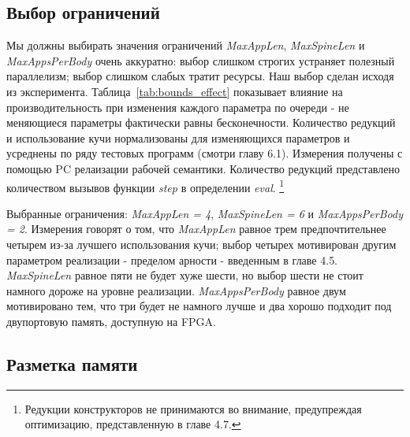\documentclass[flenqn, 14pt]{extarticle}
\begin{document}
\subsection{Выбор ограничений}
Мы должны выбирать значения ограничений \textit{MaxAppLen}, \textit{MaxSpineLen} и \textit{MaxAppsPerBody} очень аккуратно: выбор слишком строгих устраняет полезный параллелизм; выбор слишком слабых тратит ресурсы. Наш выбор сделан исходя из эксперимента. Таблица~\ref{tab:bounds_effect} показывает влияние на производительность при изменения каждого параметра по очереди - не меняющиеся параметры фактически равны бесконечности. Количество редукций и использование кучи нормализованы для изменяющихся параметров и усреднены по ряду тестовых программ (смотри главу 6.1). Измерения получены с помощью PC релаизации рабочей семантики. Количество редукций представлено количеством вызывов функции \textit{step} в определении \textit{eval}. \footnote{Редукции конструкторов не принимаются во внимание, предупреждая оптимизацию, представленную в главе 4.7.} 

Выбранные ограничения: \textit{MaxAppLen = 4}, \textit{MaxSpineLen = 6} и \textit{MaxAppsPerBody = 2}. Измерения говорят о том, что \textit{MaxAppLen} равное трем предпочтительнее четырем из-за лучшего использования кучи; выбор четырех мотивирован другим параметром реализации - пределом арности - введенным в главе 4.5. \textit{MaxSpineLen} равное пяти не будет хуже шести, но выбор шести не стоит намного дороже на уровне реализации. \textit{MaxAppsPerBody} равное двум мотивировано тем, что три будет не намного лучше и два хорошо подходит под двупортовую память, доступную на FPGA.

\subsection{Разметка памяти}
\end{document}

